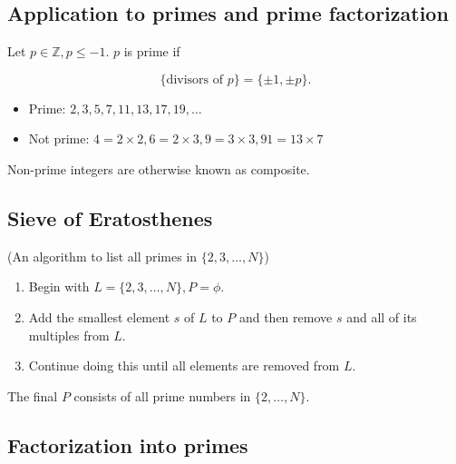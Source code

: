 \documentclass[11pt, draft]{article}
\begin{document}
\subsection{Application to primes and prime factorization}

\begin{definition} Let \(p \in \mathbb{Z}, p \leq -1\). \(p\) is prime if

    \[
        \{ \text{divisors of } p \} = \{ \pm 1, \pm p \}.
    \]
\end{definition}
\begin{example}

    \begin{itemize}
        \item Prime: \(2, 3, 5, 7, 11, 13, 17, 19, \ldots\)
        \item Not prime: \(4 = 2 \times 2, 6 = 2 \times 3, 9 = 3 \times 3, 91 = 13 \times 7\)
    \end{itemize}
\end{example}
\begin{fact} Non-prime integers are otherwise known as composite.
\end{fact}
\subsection{Sieve of Eratosthenes}

(An algorithm to list all primes in \(\{2, 3, \ldots, N\}\))

\begin{enumerate}
    \item Begin with \(L = \{2, 3, \ldots, N\}, P = \phi\).
    \item Add the smallest element \(s\) of \(L\) to \(P\) and then remove \(s\) and all
          of its multiples from \(L\).
    \item Continue doing this until all elements are removed from \(L\).
\end{enumerate}

\begin{problem} The final \(P\) consists of all prime numbers in \(\{2, \ldots, N\}\). \end{problem}

\subsection{Factorization into primes}
\end{document}
